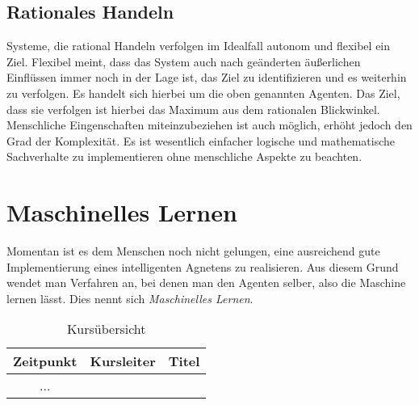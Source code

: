 \subsection{Rationales Handeln}
Systeme, die rational Handeln verfolgen im Idealfall autonom und flexibel ein Ziel. Flexibel meint, dass das System auch nach geänderten äußerlichen Einflüssen immer noch in der Lage ist, das Ziel zu identifizieren und es weiterhin zu verfolgen. Es handelt sich hierbei um die oben genannten Agenten. Das Ziel, dass sie verfolgen ist hierbei das Maximum aus dem rationalen Blickwinkel. Menschliche Eingenschaften miteinzubeziehen ist auch möglich, erhöht jedoch den Grad der Komplexität. Es ist wesentlich einfacher logische und mathematische Sachverhalte zu implementieren ohne menschliche Aspekte zu beachten.

\section{Maschinelles Lernen}
Momentan ist es dem Menschen noch nicht gelungen, eine ausreichend gute Implementierung eines intelligenten Agnetens zu realisieren. Aus diesem Grund wendet man Verfahren an, bei denen man den Agenten selber, also die Maschine lernen lässt. Dies nennt sich \textit{Maschinelles Lernen}.




\begin{table}
\caption{ Kursübersicht}
\begin{tabular}{|c|c|c|}
\hline
Zeitpunkt & Kursleiter & Titel \\
\hline 
 ...   
\end{tabular}
\end{table}